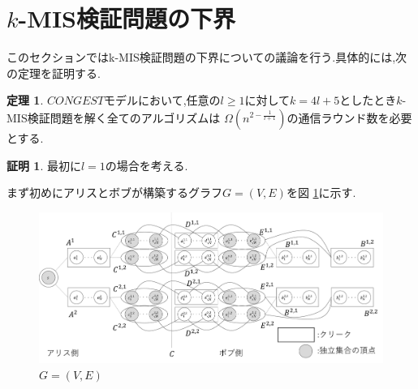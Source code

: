 \documentclass[12pt]{thesis}
\theoremstyle{definition}
\newtheorem{theorem}{定理}[chapter]
\newtheorem*{prf*}{証明}
\begin{document}
\section{$k$-MIS検証問題の下界}
このセクションではk-MIS検証問題の下界についての議論を行う.具体的には,次の定理を証明する.
\begin{theorem}
$CONGEST$モデルにおいて,任意の$l \geq 1$に対して$k = 4l + 5$としたとき$k$-MIS検証問題を解く全てのアルゴリズムは
$\Omega\left(n^{2 - \frac{1}{l+1}}\right)$の通信ラウンド数を必要とする.
\end{theorem}

\begin{prf*}
最初に$l = 1$の場合を考える. 

まず初めにアリスとボブが構築するグラフ$G = (V, E)$を図 \ref{k_G}に示す. 

\begin{figure}[ht]
\begin{center}
\includegraphics[width=120mm]{k_G.png}
\end{center}
\caption{$G = (V, E)$}
\label{k_G}
\end{figure}


\end{prf*}
\end{document}
